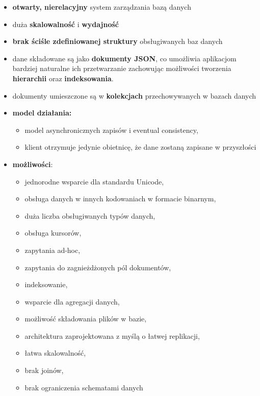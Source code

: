 \documentclass[a4paper]{article}
\begin{document}
    \begin{itemize}
        \item \textbf{otwarty, nierelacyjny} system zarządzania bazą danych
        \item duża \textbf{skalowalność} i \textbf{wydajność}
        \item \textbf{brak ściśle zdefiniowanej struktury} obsługiwanych baz danych
        \item dane składowane są jako \textbf{dokumenty JSON}, co umożliwia aplikacjom bardziej naturalne ich przetwarzanie zachowując
        możliwości tworzenia \textbf{hierarchii} oraz \textbf{indeksowania}.
        \item dokumenty umieszczone są w \textbf{kolekcjach} przechowywanych w bazach danych
        \item \textbf{model działania:}
        \begin{itemize}
            \item model asynchronicznych zapisów i eventual consistency,
            \item klient otrzymuje jedynie obietnicę, że dane zostaną zapisane w przyszłości
        \end{itemize}
        \item \textbf{możliwości}:
        \begin{itemize}
            \item jednorodne wsparcie dla standardu Unicode,
            \item obsługa danych w innych kodowaniach w formacie binarnym,
            \item duża liczba obsługiwanych typów danych,
            \item obsługa kursorów,
            \item zapytania ad-hoc,
            \item zapytania do zagnieżdżonych pól dokumentów,
            \item indeksowanie,
            \item wsparcie dla agregacji danych,
            \item możliwość składowania plików w bazie,
            \item architektura zaprojektowana z myślą o łatwej replikacji,
            \item łatwa skalowalność,
            \item brak joinów,
            \item brak ograniczenia schematami danych
        \end{itemize}

\end{itemize}
\end{document}

